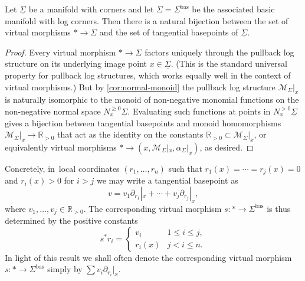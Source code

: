 \documentclass[10pt]{amsart}
\theoremstyle{definition}
\theoremstyle{remark}
\newcommand{\RR}{\mathbb{R}}
\renewcommand{\le}{\leqslant}
\renewcommand{\ge}{\geqslant}
\newcommand{\cM}{\mathscr{M}}
\newcommand{\cvf}[1]{\partial_{#1}}
\newcommand{\Sig}{\Sigma}
\newcommand{\uSig}{\underline{\Sigma}}
\newcommand{\bas}[1]{{#1}^{\mathrm{bas}}}
\newcommand{\Sigbas}{\bas{\Sig}}
\begin{document}
\begin{proposition}\label{prop:tangential-basepoints-as-weak-morphisms}
Let $\uSig$ be a manifold with corners and let $\Sig = \Sigbas$ be the associated basic manifold with log corners. Then there is a natural bijection between the set of virtual morphisms $* \to \Sig$ and the set of tangential basepoints of $\uSig$.
\end{proposition}

\begin{proof}
Every virtual morphism $* \to \Sig$ factors uniquely through the pullback log structure on its underlying image point $x \in \uSig$. (This is the standard universal property for pullback log structures, which works equally well in the context of virtual morphisms.) But by \autoref{cor:normal-monoid} the pullback log structure $\cM_{\Sig}|_x$ is naturally isomorphic to the monoid of non-negative monomial functions on the non-negative normal space $N^{\ge0}_x\uSig$. Evaluating such functions at points in $N^{>0}_x \uSig$ gives a bijection between tangential basepoints and monoid homomorphisms $\cM_{\Sig}|_x \to \RR_{>0}$ that act as the identity on the constants $\RR_{>0} \subset \cM_{\Sig}|_x$, or equivalently virtual morphisms $* \to (x,\cM_{\Sig}|_x,\alpha_\Sig|_x)$, as desired.
\end{proof}

Concretely, in~local coordinates $(r_1,\ldots, r_n)$ such that $r_1(x)=\cdots = r_j(x) = 0$ and $r_i(x) > 0$ for $i > j$ we may write a tangential basepoint as
\[
v = v_1 \cvf{r_1}|_x + \cdots + v_j\cvf{r_j}|_x,
\]
where $v_1,\ldots,v_j \in \RR_{>0}$. The corresponding virtual morphism $s\colon * \to \Sigbas$ is thus determined by the positive constants
\[
s^*r_i = \begin{cases}
v_i & 1 \le i \le j, \\
r_i(x) & j < i \le n.
\end{cases}
\]
In light of this result we shall often denote the corresponding virtual morphism $s \colon * \to \Sigbas$ simply by $\sum v_i \cvf{r_i}|_x$.
\end{document}
